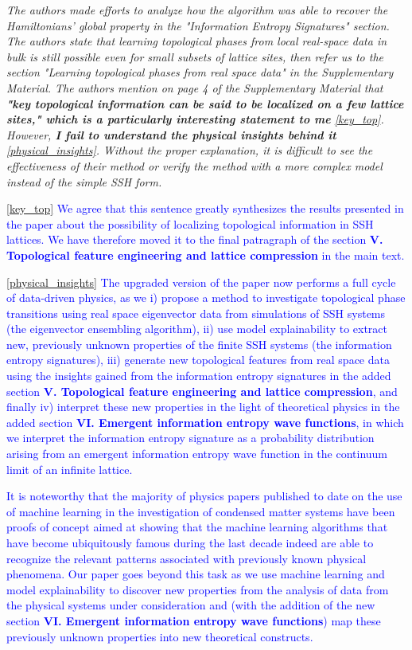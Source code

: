 \documentclass[10pt]{revtex4-1}
\newcounter{quoter}
\newcommand{\genquote}[1]{\refstepcounter{quoter} \label{#1} \ref{#1}}
\newcommand{\citequote}[1]{\ref{#1}}
\begin{document}
\vspace{0.5cm}
\emph{The authors made efforts to analyze how the algorithm was able to recover the Hamiltonians' global property in the "Information Entropy
Signatures" section. The authors state that learning topological phases from local real-space data in bulk is still possible even for
small subsets of lattice sites, then refer us to the section "Learning topological phases from real space data" in the Supplementary
Material. The authors mention on page 4 of the Supplementary Material that \textbf{"key topological information can be said to be localized on a few lattice sites," which is a particularly interesting statement to me}\genquote{key_top}. However, \textbf{I fail to understand the physical insights behind it}\genquote{physical_insights}. Without the proper explanation, it is difficult to see the effectiveness of
their method or verify the method with a more complex model instead of the simple SSH form.}

\vspace{0.25cm}
\textcolor{blue}{\citequote{key_top} We agree that this sentence greatly synthesizes the results presented in the paper about the possibility of localizing topological information in SSH lattices. We have therefore moved it to the final patragraph of the section \textbf{V. Topological feature engineering and lattice compression} in the main text.}

\textcolor{blue}{\citequote{physical_insights} The upgraded version of the paper now performs a full cycle of data-driven physics, as we i) propose a method to investigate topological phase transitions using real space eigenvector data from simulations of SSH systems (the eigenvector ensembling algorithm), ii) use model explainability to extract new, previously unknown properties of the finite SSH systems (the information entropy signatures), iii) generate new topological features from real space data using the insights gained from the information entropy signatures in the added section \textbf{V. Topological feature engineering and lattice compression},  and finally iv) interpret these new properties in the light of theoretical physics in the added section \textbf{VI. Emergent information entropy wave functions}, in which we interpret the information entropy signature as a probability distribution arising from an emergent information entropy wave function in the continuum limit of an infinite lattice.}

\textcolor{blue}{It is noteworthy that the majority of physics papers published to date on the use of machine learning in the investigation of condensed matter systems have been proofs of concept aimed at showing that the machine learning algorithms that have become ubiquitously famous during the last decade indeed are able to recognize the relevant patterns associated with previously known physical phenomena. Our paper goes beyond this task as we use machine learning and model explainability to discover new properties from the analysis of data from the physical systems under consideration and (with the addition of the new section \textbf{VI. Emergent information entropy wave functions}) map these previously unknown properties into new theoretical  constructs.}
\end{document}

